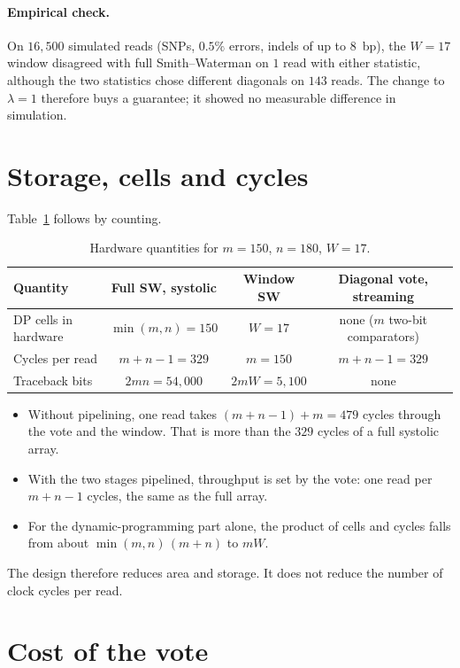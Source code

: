 \documentclass[11pt]{article}
\theoremstyle{plain}
\theoremstyle{definition}
\theoremstyle{remark}
\begin{document}
\paragraph{Empirical check.}
On $16{,}500$ simulated reads (SNPs, $0.5\%$ errors, indels of up to $8$~bp),
the $W = 17$ window disagreed with full Smith--Waterman on $1$ read with either
statistic, although the two statistics chose different diagonals on $143$ reads.
The change to $\lambda = 1$ therefore buys a guarantee; it showed no measurable
difference in simulation.

\section{Storage, cells and cycles}

Table~\ref{tab:hw} follows by counting.

\begin{table}[ht]
\centering
\caption{Hardware quantities for $m = 150$, $n = 180$, $W = 17$.}\label{tab:hw}
\begin{tabular}{@{}lccc@{}}
\toprule
Quantity & Full SW, systolic & Window SW & Diagonal vote, streaming \\
\midrule
DP cells in hardware & $\min(m,n) = 150$ & $W = 17$ & none ($m$ two-bit comparators) \\
Cycles per read      & $m + n - 1 = 329$ & $m = 150$ & $m + n - 1 = 329$ \\
Traceback bits       & $2mn = 54{,}000$  & $2mW = 5{,}100$ & none \\
\bottomrule
\end{tabular}
\end{table}

\begin{itemize}
\item Without pipelining, one read takes $(m + n - 1) + m = 479$ cycles through
      the vote and the window. That is more than the $329$ cycles of a full
      systolic array.
\item With the two stages pipelined, throughput is set by the vote: one read per
      $m + n - 1$ cycles, the same as the full array.
\item For the dynamic-programming part alone, the product of cells and cycles
      falls from about $\min(m,n)\,(m+n)$ to $mW$.
\end{itemize}
The design therefore reduces area and storage. It does not reduce the number of
clock cycles per read.

\section{Cost of the vote}
\end{document}

